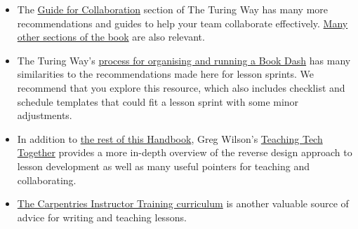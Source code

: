 \documentclass[
]{book}
\providecommand{\tightlist}{%
  \setlength{\itemsep}{0pt}\setlength{\parskip}{0pt}}
\begin{document}
\begin{itemize}
\tightlist
\item
  The \href{https://the-turing-way.netlify.app/collaboration/collaboration.html}{Guide for Collaboration} section of The Turing Way has many more recommendations and guides to help your team collaborate effectively. \href{https://the-turing-way.netlify.app/welcome.html}{Many other sections of the book} are also relevant.
\item
  The Turing Way's \href{https://the-turing-way.netlify.app/community-handbook/bookdash.html}{process for organising and running a Book Dash} has many similarities to the recommendations made here for lesson sprints. We recommend that you explore this resource, which also includes checklist and schedule templates that could fit a lesson sprint with some minor adjustments.
\item
  In addition to \href{https://cdh.carpentries.org/}{the rest of this Handbook}, Greg Wilson's \href{https://teachtogether.tech}{Teaching Tech Together} provides a more in-depth overview of the reverse design approach to lesson development as well as many useful pointers for teaching and collaborating.
\item
  \href{https://carpentries.github.io/instructor-training/}{The Carpentries Instructor Training curriculum} is another valuable source of advice for writing and teaching lessons.
\end{itemize}

  
\end{document}
